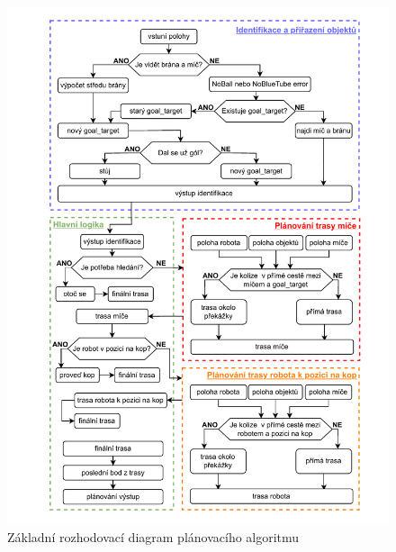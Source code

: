 \documentclass[a4paper,12pt]{article}
\begin{document}
\begin{figure}
	\centering
	\includegraphics[width=\linewidth]{pictures/PlanningDiagram.pdf}
	\caption{Základní rozhodovací diagram plánovacího algoritmu}
	\label{fig:fig_plan_dig}
\end{figure}
\end{document}
